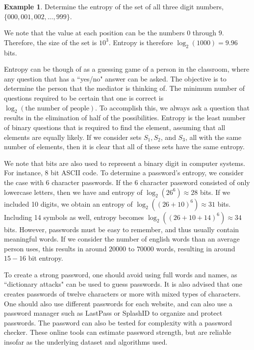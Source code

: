 \documentclass[11pt]{article}
\theoremstyle{plain} %
\theoremstyle{definition}
\theoremstyle{example}
\newtheorem*{example}{Example}
\theoremstyle{remark}
\begin{document}
\begin{example}
Determine the entropy of the set of all three digit numbers, $\{000,001,002,...,999\}$. 
\end{example}

We note that the value at each position can be the numbers $0$ through $9$. Therefore, the size of the set is $10^3$. Entropy is therefore $\log_2(1000) = 9.96$ bits. 

Entropy can be though of as a guessing game of a person in the classroom, where any question that has a ``yes/no" answer can be asked. The objective is to determine the person that the mediator is thinking of. The minimum number of questions required to be certain that one is correct is $\log_2(\text{the number of people})$. To accomplish this, we always ask a question that results in the elimination of half of the possibilities. Entropy is the least number of binary questions that is required to find the element, assuming that all elements are equally likely. If we consider sets $S_1, S_2$, and $S_3$, all with the same number of elements, then it is clear that all of these sets have the same entropy. 

We note that bits are also used to represent a binary digit in computer systems. For instance, 8 bit ASCII code. To determine a password's entropy, we consider the case with 6 character passwords. If the 6 character password consisted of only lowercase letters, then we have and entropy of $\log_2\left(26^6\right) \approx 28$ bits. If we included 10 digits, we obtain an entropy of $\log_2\left((26+10)^6\right) \approx 31$ bits. Including 14 symbols as well, entropy becomes $\log_2\left((26+10+14)^6\right) \approx 34$ bits. However, passwords must be easy to remember, and thus usually contain meaningful words. If we consider the number of english words than an average person uses, this results in around $20000$ to $70000$ words, resulting in around $15-16$ bit entropy. 

To create a strong password, one should avoid using full words and names, as ``dictionary attacks" can be used to guess passwords. It is also advised that one creates passwords of twelve characters or more with mixed types of characters. One should also use different passwords for each website, and can also use a password manager such as LastPass or 
SplashID to organize and protect passwords. The password can also be tested for complexity with a password checker. These online tools can estimate password strength, but are reliable insofar as the underlying dataset and algorithms used. 
\end{document}
